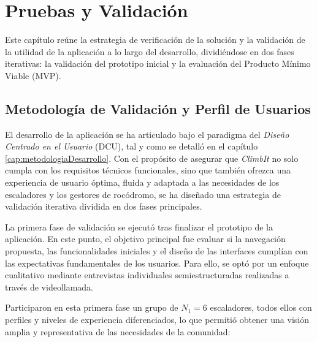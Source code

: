 \chapter{Pruebas y Validación}
\label{cap:pruebasValidacion}

Este capítulo reúne la estrategia de verificación de la solución y la validación de la utilidad de la aplicación a lo largo del desarrollo, dividiéndose en dos fases iterativas: la validación del prototipo inicial y la evaluación del Producto Mínimo Viable (MVP).

\section{Metodología de Validación y Perfil de Usuarios}

El desarrollo de la aplicación se ha articulado bajo el paradigma del \textit{Diseño Centrado en el Usuario} (DCU), tal y como se detalló en el capítulo \ref{cap:metodologiaDesarrollo}. Con el propósito de asegurar que \textit{ClimbIt} no solo cumpla con los requisitos técnicos funcionales, sino que también ofrezca una experiencia de usuario óptima, fluida y adaptada a las necesidades de los escaladores y los gestores de rocódromo, se ha diseñado una estrategia de validación iterativa dividida en dos fases principales.

La primera fase de validación se ejecutó tras finalizar el prototipo de la aplicación. En este punto, el objetivo principal fue evaluar si la navegación propuesta, las funcionalidades iniciales y el diseño de las interfaces cumplían con las expectativas fundamentales de los usuarios. Para ello, se optó por un enfoque cualitativo mediante entrevistas individuales semiestructuradas realizadas a través de videollamada. 

Participaron en esta primera fase un grupo de $N_1 = 6$ escaladores, todos ellos con perfiles y niveles de experiencia diferenciados, lo que permitió obtener una visión amplia y representativa de las necesidades de la comunidad:

